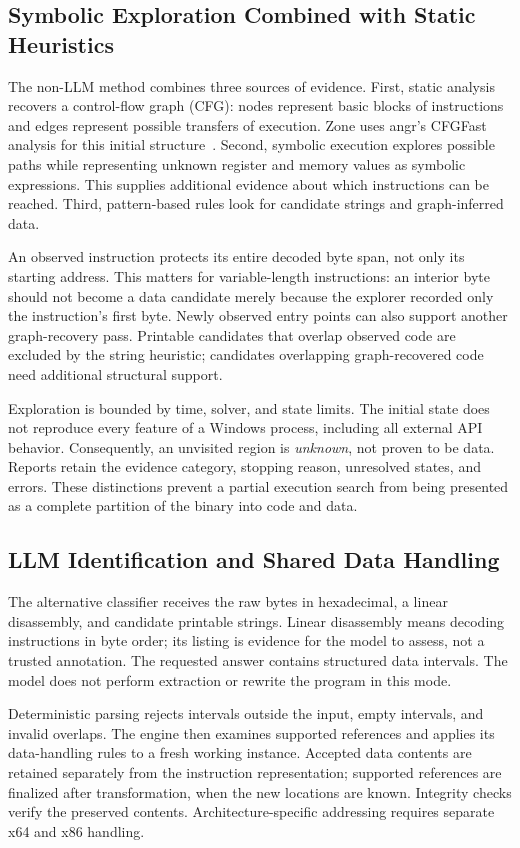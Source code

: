 \subsection{Symbolic Exploration Combined with Static Heuristics}
The non-LLM method combines three sources of evidence. First, static
analysis recovers a control-flow graph (CFG): nodes represent basic blocks
of instructions and edges represent possible transfers of execution.
Zone uses angr's CFGFast analysis for this initial structure~\cite{angr_cfg_docs}.
Second, symbolic execution explores possible paths while representing
unknown register and memory values as symbolic expressions. This supplies
additional evidence about which instructions can be reached. Third,
pattern-based rules look for candidate strings and graph-inferred data.

An observed instruction protects its entire decoded byte span, not only
its starting address. This matters for variable-length instructions: an
interior byte should not become a data candidate merely because the
explorer recorded only the instruction's first byte. Newly observed entry
points can also support another graph-recovery pass. Printable candidates
that overlap observed code are excluded by the string heuristic; candidates
overlapping graph-recovered code need additional structural support.

Exploration is bounded by time, solver, and state limits. The initial state
does not reproduce every feature of a Windows process, including all
external API behavior. Consequently, an unvisited region is \emph{unknown},
not proven to be data. Reports retain the evidence category, stopping
reason, unresolved states, and errors. These distinctions prevent a
partial execution search from being presented as a complete partition of
the binary into code and data.

\subsection{LLM Identification and Shared Data Handling}
The alternative classifier receives the raw bytes in hexadecimal, a
linear disassembly, and candidate printable strings. Linear disassembly
means decoding instructions in byte order; its listing is evidence for the
model to assess, not a trusted annotation. The requested answer contains
structured data intervals. The model does not perform extraction or
rewrite the program in this mode.

Deterministic parsing rejects intervals outside the input, empty intervals,
and invalid overlaps. The engine then examines supported references and
applies its data-handling rules to a fresh working instance. Accepted data
contents are retained separately from the instruction representation;
supported references are finalized after transformation, when the new
locations are known. Integrity checks verify the preserved contents.
Architecture-specific addressing requires separate x64 and x86 handling.

